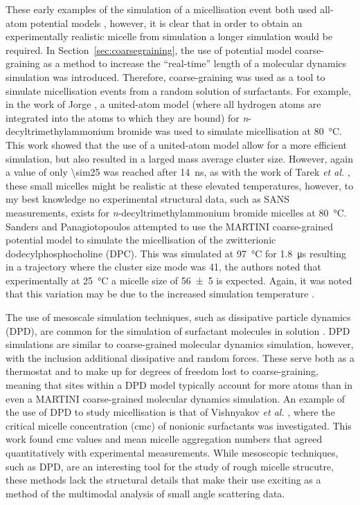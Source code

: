 These early examples of the simulation of a micellisation event both used all-atom potential models \cite{tarek_molecular_1998,maillet_large_1999}, however, it is clear that in order to obtain an experimentally realistic micelle from simulation a longer simulation would be required.
In Section~\ref{sec:coarsegraining}, the use of potential model coarse-graining as a method to increase the ``real-time'' length of a molecular dynamics simulation was introduced.
Therefore, coarse-graining was used as a tool to simulate micellisation events from a random solution of surfactants.
For example, in the work of Jorge \cite{jorge_molecular_2008}, a united-atom model (where all hydrogen atoms are integrated into the atoms to which they are bound) for \emph{n}-decyltrimethylammonium bromide was used to simulate micellisation at \SI{80}{\celsius}.
This work showed that the use of a united-atom model allow for a more efficient simulation, but also resulted in a larged mass average cluster size.
However, again a value of only \num{\sim25} was reached after \SI{14}{\nano\second}, as with the work of Tarek \emph{et al.} \cite{tarek_molecular_1998}, these small micelles might be realistic at these elevated temperatures, however, to my best knowledge no experimental structural data, such as SANS measurements, exists for \emph{n}-decyltrimethylammonium bromide micelles at \SI{80}{\celsius}.
Sanders and Panagiotopoulos attempted to use the MARTINI coarse-grained potential model to simulate the micellisation of the zwitterionic dodecylphosphocholine (DPC).
This was simulated at \SI{97}{\celsius} for \SI{1.8}{\micro\second} resulting in a trajectory where the cluster size mode was 41, the authors noted that experimentally at \SI{25}{\celsius} a micelle size of \num{56\pm5} is expected.
Again, it was noted that this variation may be due to the increased simulation temperature \cite{malliaris_temperature_1985,kamenka_aqueous_1995}.

The use of mesoscale simulation techniques, such as dissipative particle dynamics (DPD), are common for the simulation of surfactant molecules in solution \cite{shelley_computer_2000}.
DPD simulations are similar to coarse-grained molecular dynamics simulation, however, with the inclusion additional dissipative and random forces.
These serve both as a thermostat and to make up for degrees of freedom lost to coarse-graining, meaning that sites within a DPD model typically account for more atoms than in even a MARTINI coarse-grained molecular dynamics simulation.
An example of the use of DPD to study micellisation is that of Vishnyakov \emph{et al.} \cite{vishnyakov_prediction_2013}, where the critical micelle concentration (cmc) of nonionic surfactants was investigated.
This work found cmc values and mean micelle aggregation numbers that agreed quantitatively with experimental measurements.
While mesoscopic techniques, such as DPD, are an interesting tool for the study of rough micelle strucutre, these methods lack the structural details that make their use exciting as a method of the multimodal analysis of small angle scattering data.


